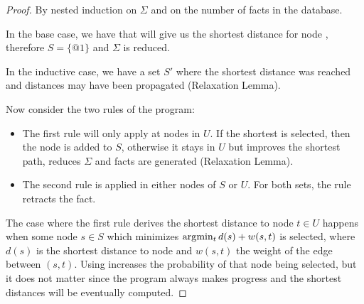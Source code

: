 \begin{proof}
   By nested induction on $\Sigma$ and on the number of facts in the database.

   In the base case, we have  that will give us
   the shortest distance for node , therefore $S = \{@1\}$ and
   $\Sigma$ is reduced.

   In the inductive case, we have a set $S'$ where the shortest distance was
   reached and  distances may have been propagated (Relaxation
   Lemma).

   Now consider the two rules of the program:

   \begin{itemize}

      \item The first rule will only apply at nodes in $U$. If the shortest
          is selected, then the node is added to $S$, otherwise it
         stays in $U$ but improves the shortest path, reduces $\Sigma$ and
          facts are generated (Relaxation Lemma).

      \item The second rule is applied in either nodes of $S$ or $U$. For both
         sets, the rule retracts the  fact.

   \end{itemize}

   The case where the first rule derives the shortest  distance to
   node $t \in U$ happens when some node $s \in S$ which minimizes $\arg\!\min_t
   d(s) + w(s, t)$ is selected, where $d(s)$ is the shortest distance to node
    and $w(s, t)$ the weight of the edge between $(s, t)$.
   Using  increases the probability of that node being
   selected, but it does not matter since the program always makes progress and
   the shortest distances will be eventually computed.

\end{proof}
